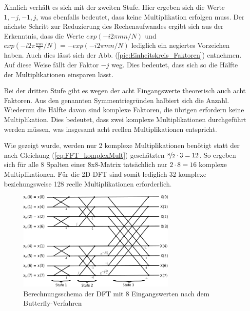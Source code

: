 Ähnlich verhält es sich mit der zweiten Stufe.
Hier ergeben sich die Werte $1, -j, -1, j$, was ebenfalls bedeutet, dass keine Multiplikation erfolgen muss. Der nächste Schritt zur Reduzierung des Rechenaufwandes ergibt sich
aus der Erkenntnis, dass die Werte $exp(-i 2 \pi m n/N)$ und $exp(-i 2 \pi \frac{m n}{2}/N) = -exp(-i 2 \pi m n/N)$ lediglich ein negiertes Vorzeichen haben. Auch dies lässt sich der 
Abb. (\ref{pic:Einheitskreis_Faktoren}) entnehmen. Auf diese Weise fällt der Faktor $-j$ weg. Dies bedeutet, dass sich so die Hälfte der Multiplikationen einsparen lässt.

Bei der dritten Stufe gibt es wegen der acht Eingangswerte theoretisch auch acht Faktoren. Aus den genannten Symmentriegründen halbiert sich die Anzahl. Wiederum die Hälfte davon 
sind komplexe Faktoren, die übrigen erfordern keine Multiplikation. Dies bedeutet, dass zwei komplexe Multiplikationen durchgeführt werden müssen, was insgesamt acht reellen 
Multiplikationen entspricht. 

Wie gezeigt wurde, werden nur 2 komplexe Multiplikationen benötigt statt der nach Gleichung (\ref{eq:FFT_komplexMult}) geschätzten $\nicefrac{8}{2}\cdot 3 = 12$.
So ergeben sich für alle 8 Spalten einer 8x8-Matrix tatsächlich nur $2\cdot8=16$ komplexe Multiplikationen. 
Für die 2D-DFT sind somit lediglich 32 komplexe beziehungsweise 128 reelle Multiplikationen erforderlich.



\begin{figure}[htbp]
 \centering
 \includegraphics[width=0.7\textwidth]{img/Butterfly.png}
 \caption{Berechnungsschema der DFT mit 8 Eingangswerten nach dem Butterfly-Verfahren}
 \label{pic:Butterfly}
\end{figure}



